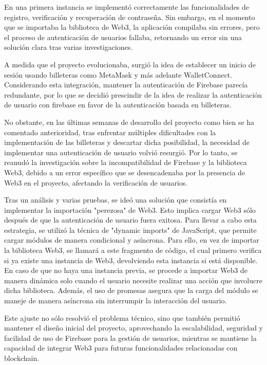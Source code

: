 En una primera instancia se implementó correctamente las funcionalidades de registro, verificación y recuperación de contraseña.
Sin embargo, en el momento que se importaba la biblioteca de Web3, la aplicación compilaba sin errores, pero el proceso de autenticación de usuarios fallaba, retornando un error sin una solución clara tras varias investigaciones.

A medida que el proyecto evolucionaba, surgió la idea de establecer un inicio de sesión usando billeteras como MetaMask y más adelante WalletConnect. Considerando esta integración, mantener la autenticación de Firebase parecía redundante, por lo que se decidió prescindir de la idea de realizar la autenticación de usuario con firebase en favor de la autenticación basada en billeteras.
 
No obstante, en las últimas semanas de desarrollo del proyecto como bien se ha comentado anterioridad, tras enfrentar múltiples dificultades con la implementación de las billeteras y descartar dicha posibilidad, la necesidad de implementar una autenticación de usuario volvió resurgió.
Por lo tanto, se reanudó la investigación sobre la incompatibilidad de Firebase y la biblioteca Web3, debido a un error específico que se desencadenaba por la presencia de Web3 en el proyecto, afectando la verificación de usuarios.

Tras un análisis y varias pruebas, se ideó una solución que consistía en implementar la importación "perezosa" de Web3. Esto implica cargar Web3 sólo después de que la autenticación de usuario fuera exitosa. Para llevar a cabo esta estrategia, se utilizó la técnica de "dynamic imports" de JavaScript, que permite cargar módulos de manera condicional y asíncrona. 
Para ello, en vez de importar la biblioteca Web3, se llamará a este fragmento de código, el cual primero verifica si ya existe una instancia de Web3, devolviendo esta instancia si está disponible. En caso de que no haya una instancia previa, se procede a importar Web3 de manera dinámica solo cuando el usuario necesite realizar una acción que involucre dicha biblioteca.
Además, el uso de promesas asegura que la carga del módulo se maneje de manera asíncrona  sin interrumpir la interacción del usuario.


Este ajuste no sólo resolvió el problema técnico, sino que también permitió mantener el diseño inicial del proyecto, aprovechando la escalabilidad, seguridad y facilidad de uso de Firebase para la gestión de usuarios, mientras se mantiene la capacidad de integrar Web3 para futuras funcionalidades relacionadas con blockchain.